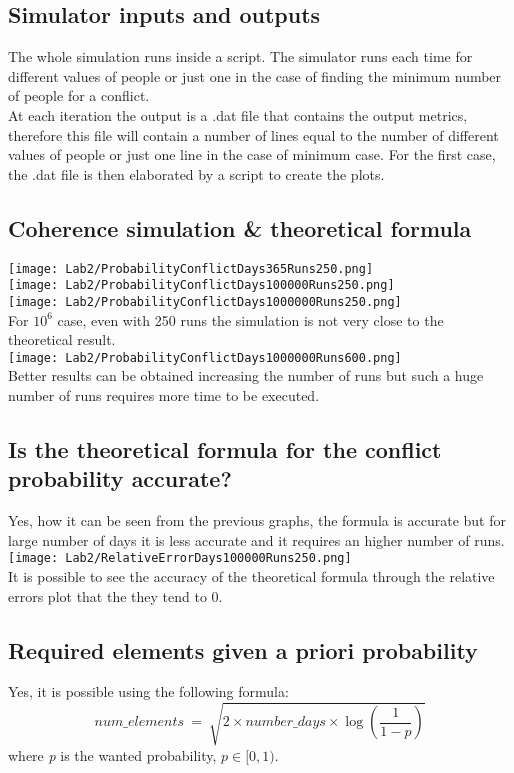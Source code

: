 \documentclass[twocolumn,letterpaper]{report}
\begin{document}
{	\subsection{Simulator inputs and outputs}
			The whole simulation runs inside a script. The simulator runs each time for different values of people or just one in the case of finding the minimum number of people for a conflict. \\
			At each iteration the output is a .dat file that contains the output metrics, therefore this file will contain a number of lines equal to the number of different values of people or just one line in the case of minimum case. For the first case, the .dat file is then elaborated by a script to create the plots.
		
		\subsection{Coherence simulation \& theoretical formula}
				\texttt{[image: Lab2/ProbabilityConflictDays365Runs250.png]} \\
				\texttt{[image: Lab2/ProbabilityConflictDays100000Runs250.png]} \\
				\texttt{[image: Lab2/ProbabilityConflictDays1000000Runs250.png]} \\
				For $10^6$ case, even with 250 runs the simulation is not very close to the theoretical result. \\
				\texttt{[image: Lab2/ProbabilityConflictDays1000000Runs600.png]} \\
				Better results can be obtained increasing the number of runs but such a huge number of runs requires more time to be executed.
				
		\subsection{Is the theoretical formula for the conflict probability accurate?}
				Yes, how it can be seen from the previous graphs, the formula is accurate but for large number of days it is less accurate and it requires an higher number of runs.
				\texttt{[image: Lab2/RelativeErrorDays100000Runs250.png]} \\
				It is possible to see the accuracy of the theoretical formula through the relative errors plot that the they tend to 0.
				
				
		\subsection{Required elements given a priori probability}
				Yes, it is possible using the following formula:
				\[
						num\_elements \: = \: \sqrt{2 \times number\_days \times \log{ \left( \frac{1}{1-p} \right) } }
				\]
							where \emph{p} is the wanted probability, $ p \in [0,1)$. \\
							
}
\end{document}
